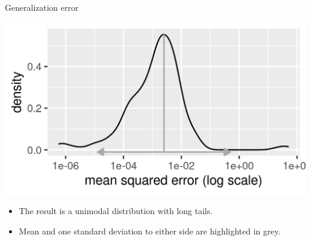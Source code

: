 \begin{vbframe}{Generalization error}
\vfill

\begin{minipage}[c]{0.5\textwidth}
  \includegraphics[width=\textwidth]{figure/fig_loss_distribution}
\end{minipage}
\begin{minipage}[c]{0.45\textwidth}
  \begin{itemize}
    \small
    \item The result is a unimodal 
    distribution with long tails.
    \item Mean and one standard deviation to either side are highlighted in 
    grey.
  \end{itemize}
\end{minipage}

\end{vbframe}


